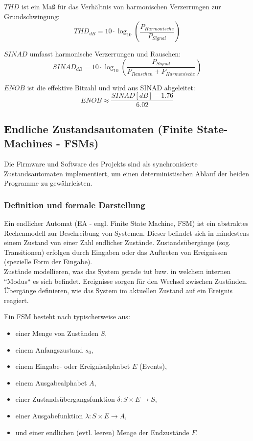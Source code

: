 \documentclass[a4paper, portrait, 12pt]{scrartcl} %
\begin{document}
\textbf{$THD$} ist ein Maß für das Verhältnis von harmonischen Verzerrungen zur Grundschwingung:
\begin{equation}
	THD_{dB}=10\cdot \log_{10}\left( \frac{P_{Harmonische}}{P_{Signal}}\right)
\end{equation}

\textbf{$SINAD$} umfasst harmonische Verzerrungen und Rauschen:
\begin{equation}
	SINAD_{dB}=10\cdot \log_{10}\left( \frac{P_{Signal}}{P_{Rauschen}+P_{Harmonische}}\right)
\end{equation}

\textbf{$ENOB$} ist die effektive Bitzahl und wird aus SINAD abgeleitet:
\begin{equation}
	ENOB\approx \frac{SINAD[dB]-1.76}{6.02}
\end{equation}





\pagebreak

\subsection{Endliche Zustandsautomaten (Finite State-Machines - FSMs)}
\label{subsec:fsm}
Die Firmware und Software des Projekts sind als synchronisierte Zustandsautomaten implementiert, um einen deterministischen Ablauf der beiden Programme zu gewährleisten.
\subsubsection{Definition und formale Darstellung}
Ein endlicher Automat (EA - engl. Finite State Machine, FSM) ist ein abstraktes Rechenmodell zur Beschreibung von Systemen. Dieser befindet sich in mindestens einem Zustand von einer Zahl endlicher Zustände. Zustandsübergänge (sog. Transitionen) erfolgen durch Eingaben oder das Auftreten von Ereignissen (spezielle Form der Eingabe).\\

Zustände modellieren, was das System gerade tut bzw. in welchem internen ``Modus`` es sich befindet. Ereignisse sorgen für den Wechsel zwischen Zuständen. Übergänge definieren, wie das System im aktuellen Zustand auf ein Ereignis reagiert.

Ein FSM besteht nach \cite[S. 7ff]{Baesig2019} typischerweise aus:
\begin{itemize}
	\item einer Menge von Zuständen $S$,
	\item einem Anfangszustand $s_0$,
	\item einem Eingabe- oder Ereignisalphabet $E$ (Events),
	\item einem Ausgabealphabet $A$,
	\item einer Zustandsübergangsfunktion $\delta :S\times E\rightarrow S$,
	\item einer Ausgabefunktion $\lambda :S\times E\rightarrow A$,
	\item und einer endlichen (evtl. leeren) Menge der Endzustände $F$.
\end{itemize}
\end{document}
